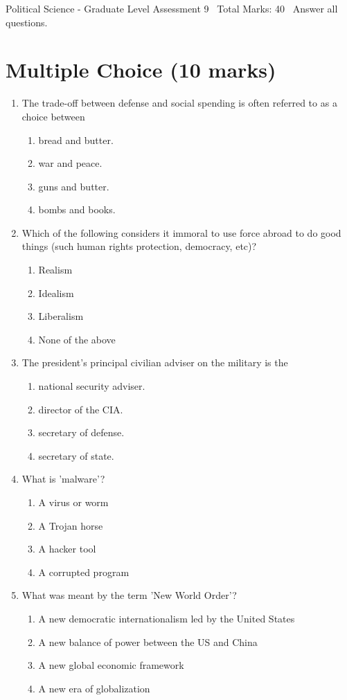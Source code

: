 \documentclass[12pt]{article}
\begin{document}
\begin{center}
Political Science - Graduate Level Assessment 9 \
Total Marks: 40 \
Answer all questions.
\end{center}

\section*{Multiple Choice (10 marks)}
\begin{enumerate}[label=\arabic*.]
\item The trade-off between defense and social spending is often referred to as a choice between
\begin{enumerate}[label=(\alph*)]
    \item bread and butter.
    \item war and peace.
    \item guns and butter.
    \item bombs and books.
\end{enumerate}
\item Which of the following considers it immoral to use force abroad to do good things (such human rights protection, democracy, etc)?
\begin{enumerate}[label=(\alph*)]
    \item Realism
    \item Idealism
    \item Liberalism
    \item None of the above
\end{enumerate}
\item The president's principal civilian adviser on the military is the
\begin{enumerate}[label=(\alph*)]
    \item national security adviser.
    \item director of the CIA.
    \item secretary of defense.
    \item secretary of state.
\end{enumerate}
\item What is 'malware'?
\begin{enumerate}[label=(\alph*)]
    \item A virus or worm
    \item A Trojan horse
    \item A hacker tool
    \item A corrupted program
\end{enumerate}
\item What was meant by the term 'New World Order'?
\begin{enumerate}[label=(\alph*)]
    \item A new democratic internationalism led by the United States
    \item A new balance of power between the US and China
    \item A new global economic framework
    \item A new era of globalization
\end{enumerate}
\end{enumerate}
\end{document}
